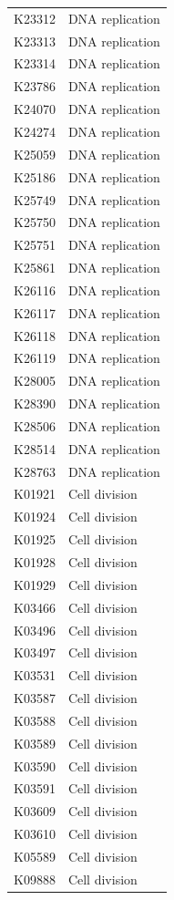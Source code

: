 \begin{longtable}{@{}l l@{}}
K23312 & DNA replication \\
K23313 & DNA replication \\
K23314 & DNA replication \\
K23786 & DNA replication \\
K24070 & DNA replication \\
K24274 & DNA replication \\
K25059 & DNA replication \\
K25186 & DNA replication \\
K25749 & DNA replication \\
K25750 & DNA replication \\
K25751 & DNA replication \\
K25861 & DNA replication \\
K26116 & DNA replication \\
K26117 & DNA replication \\
K26118 & DNA replication \\
K26119 & DNA replication \\
K28005 & DNA replication \\
K28390 & DNA replication \\
K28506 & DNA replication \\
K28514 & DNA replication \\
K28763 & DNA replication \\
K01921 & Cell division \\
K01924 & Cell division \\
K01925 & Cell division \\
K01928 & Cell division \\
K01929 & Cell division \\
K03466 & Cell division \\
K03496 & Cell division \\
K03497 & Cell division \\
K03531 & Cell division \\
K03587 & Cell division \\
K03588 & Cell division \\
K03589 & Cell division \\
K03590 & Cell division \\
K03591 & Cell division \\
K03609 & Cell division \\
K03610 & Cell division \\
K05589 & Cell division \\
K09888 & Cell division \\
\end{longtable}